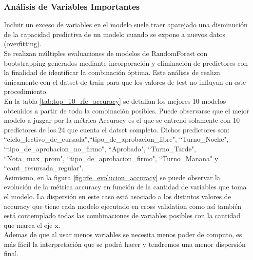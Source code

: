 \subsubsection{\textbf{Análisis de Variables Importantes}}\label{analisis-var_importantes}

Incluir un exceso de variables en el modelo suele traer aparejado una disminución de la capacidad predictiva de un modelo cuando se expone a nuevos datos (overfitting). \\
Se realizan múltiples evaluaciones de modelos de RandomForest con bootstrapping generados mediante incorporación y eliminación de predictores con la finalidad de identificar la combinación óptima. Este análisis de realiza únicamente con el datset de train para que los valores de test no influyan en este procedimiento.\\

En la tabla \ref{tab:top_10_rfe_accuracy} se detallan los mejores 10 modelos obtenidos a partir de toda la combinación posibles. Puede observarse que el mejor modelo a juzgar por la métrica Accuracy es el que se entrenó solamente con 10 predictores de los 24 que cuenta el datset completo. Dichos predictores son: 
``ciclo\_lectivo\_de\_cursada",``tipo\_de\_aprobacion\_libre", ``Turno\_Noche", ``tipo\_de\_aprobacion\_no\_firmo", ``Aprobado", ``Turno\_Tarde", ``Nota\_max\_prom", ``tipo\_de\_aprobacion\_firmo", ``Turno\_Manana" y ``cant\_resursada\_regular".\\

Asimismo, en la figura \ref{fig:rfe_evolucion_accuracy} se puede observar la evolución de la métrica accuracy en función de la cantidad de variables que toma el modelo. La dispersión en este caso está asociado a los distintos valores de accuracy que tiene cada modelo ejecutado en cross validation como así también está contemplado todas las combinaciones de variables posibles con la cantidad que marca el eje x.\\
Ademas de que al usar menos variables se necesita menos poder de computo, es más fácil la interpretación que se podrá hacer y tendremos una menor dispersión final.

